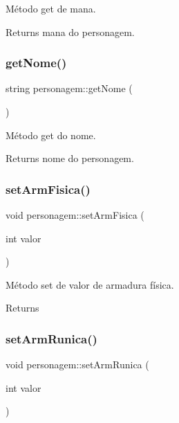 Método get de mana. 

\begin{DoxyReturn}{Returns}
mana do personagem. 
\end{DoxyReturn}
\mbox{\label{classpersonagem_a9b58d2e434e2fbc15786ce24bdf593ec}} 
\subsubsection{\texorpdfstring{get\+Nome()}{getNome()}}
{\footnotesize\ttfamily string personagem\+::get\+Nome (\begin{DoxyParamCaption}{ }\end{DoxyParamCaption})}



Método get do nome. 

\begin{DoxyReturn}{Returns}
nome do personagem. 
\end{DoxyReturn}
\mbox{\label{classpersonagem_ac1561638f8684db27731b49ddbc5c386}} 
\subsubsection{\texorpdfstring{set\+Arm\+Fisica()}{setArmFisica()}}
{\footnotesize\ttfamily void personagem\+::set\+Arm\+Fisica (\begin{DoxyParamCaption}\item[{int}]{valor }\end{DoxyParamCaption})}



Método set de valor de armadura física. 

\begin{DoxyReturn}{Returns}

\end{DoxyReturn}
\mbox{\label{classpersonagem_aad825560abd7cd0a8760d4ee38baa612}} 
\subsubsection{\texorpdfstring{set\+Arm\+Runica()}{setArmRunica()}}
{\footnotesize\ttfamily void personagem\+::set\+Arm\+Runica (\begin{DoxyParamCaption}\item[{int}]{valor }\end{DoxyParamCaption})}



